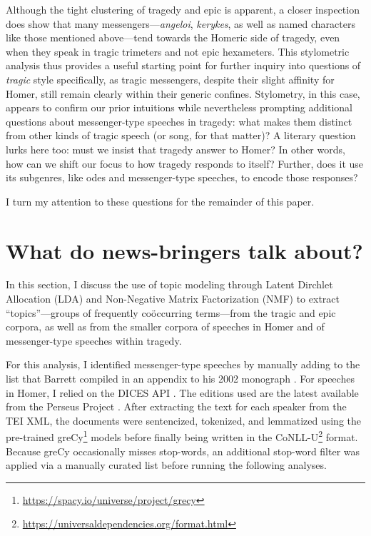 \documentclass{jcls}
\begin{document}
Although the tight clustering of tragedy and epic is apparent, a
closer inspection does show that many messengers---\textit{angeloi},
\textit{kerykes}, as well as named characters like those mentioned
above---tend towards the Homeric side of tragedy, even when they
speak in tragic trimeters and not epic hexameters. This stylometric
analysis thus provides a useful starting point for further inquiry
into questions of \textit{tragic} style specifically, as tragic
messengers, despite their slight affinity for Homer, still remain
clearly within their generic confines. Stylometry, in this case, appears to
confirm our prior intuitions while nevertheless prompting additional
questions about messenger-type speeches in tragedy: what makes them
distinct from other kinds of tragic speech (or song, for that matter)?
A literary question lurks here too: must we insist that tragedy
answer to Homer? In other words, how can we shift our focus to how
tragedy responds to itself? Further, does it use its subgenres, like odes
and messenger-type speeches, to encode those responses?

I turn my attention to these questions for the remainder of this paper.

\section{What do news-bringers talk about?}

In this section, I discuss the use of topic modeling through Latent
Dirchlet Allocation (LDA) and Non-Negative Matrix Factorization (NMF)
to extract ``topics''---groups of frequently coöccurring terms---from
the tragic and epic corpora, as well as from the smaller corpora of
speeches in Homer and of messenger-type speeches within tragedy.

For this analysis, I identified messenger-type speeches by manually
adding to the list that Barrett compiled in an appendix to his 2002
monograph \cite[223--224]{Barrett2002}. For speeches in Homer, I
relied on the DICES API \cite{Forstall.etal2022}. The editions used
are the latest available from the Perseus Project
\cite{Crane.etal2025}. After extracting the text for each speaker
from the TEI XML, the documents were sentencized, tokenized, and
lemmatized using the pre-trained
greCy\footnote{\url{https://spacy.io/universe/project/grecy}} models
before finally being written in the
CoNLL-U\footnote{\url{https://universaldependencies.org/format.html}}
format. Because greCy occasionally misses stop-words, an additional
stop-word filter was applied via a manually curated list before
running the following analyses.
\end{document}
